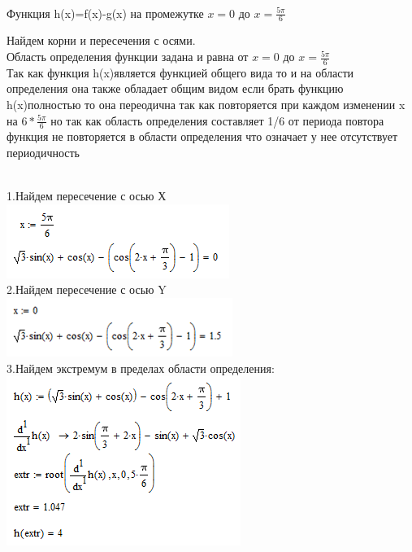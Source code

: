 \documentclass[russian,utf8,nocolumnxxxi,nocolumnxxxii]{eskdtext}
\begin{document}
\newpage
\\Функция h(x)=f(x)-g(x) на промежутке $x=0$ до $x=\frac{5\pi}{6}$ \\

Найдем корни и пересечения с осями.
\\Область определения функции задана и равна от $x=0$ до $x=\frac{5\pi}{6}$
\\Так как функция h(x)является функцией общего вида то и на области определения она также обладает общим видом если брать функцию h(x)полностью то она переодична так как повторяется при каждом изменении x на $6*\frac {5\pi}{6}$ но так как область определения составляет 1/6 от периода повтора функция не повторяется в области определения что означает у нее отсутствует периодичность
\par
\normalsize
\\1.Найдем пересечение с осью Х
\\\includegraphics[scale=0.90]{3}
\\2.Найдем пересечение с осью Y
\\\includegraphics[scale=0.90]{4}
\newpage
\\3.Найдем экстремум в пределах области определения:
\\\includegraphics[scale=1]{5}
\end{document}
